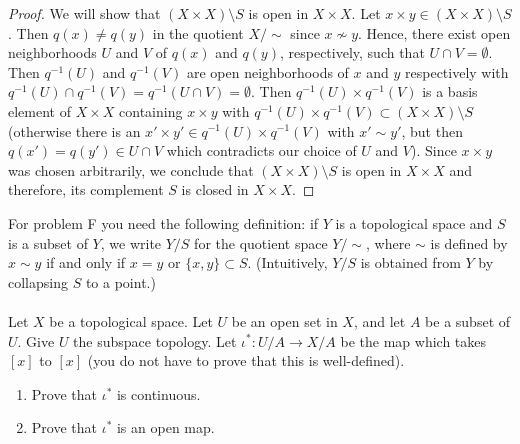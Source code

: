 \begin{proof}
We will show that $(X\times X)\setminus S$ is open in $X\times
X$. Let $x\times y\in (X\times X)\setminus S$. Then $q(x)\neq
q(y)$ in the quotient $X/{\sim}$ since $x\nsim y$. Hence, there
exist open neighborhoods $U$ and $V$ of $q(x)$ and $q(y)$,
respectively, such that $U\cap V=\emptyset$. Then $q^{-1}(U)$ and
$q^{-1}(V)$ are open neighborhoods of $x$ and $y$ respectively
with $q^{-1}(U)\cap q^{-1}(V)=q^{-1}(U\cap V)=\emptyset$. Then
$q^{-1}(U)\times q^{-1}(V)$ is a basis element of $X\times X$
containing $x\times y$ with $q^{-1}(U)\times q^{-1}(V)\subset
(X\times X)\setminus S$ (otherwise there is an $x'\times y'\in
q^{-1}(U)\times q^{-1}(V)$ with $x'\sim y'$, but then
$q\left(x'\right)=q\left(y'\right)\in U\cap V$ which contradicts
our choice of $U$ and $V$). Since $x\times y$ was chosen
arbitrarily, we conclude that $(X\times X)\setminus S$ is open in
$X\times X$ and therefore, its complement $S$ is closed in
$X\times X$.
\end{proof}
\newpage
\begin{problem}[F]
For problem F you need the following definition: if $Y$ is a
topological space and $S$ is a subset of $Y$, we write $Y/S$ for
the quotient space $Y/{\sim}$, where $\sim$ is defined by $x\sim y$
if and only if $x=y$ or $\{x,y\}\subset S$. (Intuitively, $Y/S$
is obtained from $Y$ by collapsing $S$ to a point.)
\\\\
Let $X$ be a topological space. Let $U$ be an open set in $X$,
and let $A$ be a subset of $U$. Give $U$ the subspace
topology. Let $\iota^*\colon U/A\to X/A$ be the map which takes
$[x]$ to $[x]$ (you do not have to prove that this is
well-defined).
\begin{enumerate}[noitemsep,label=(\roman*)]
\item Prove that $\iota^*$ is continuous.
\item Prove that $\iota^*$ is an open map.
\end{enumerate}
\end{problem}
